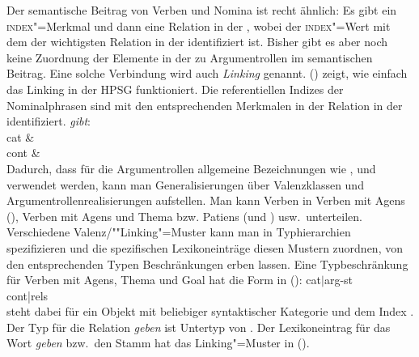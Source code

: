 Der semantische Beitrag von Verben und Nomina ist recht ähnlich: Es gibt ein \textsc{index}"=Merkmal
und dann eine Relation in der \relsl, wobei der \textsc{index}"=Wert mit dem \argzero der
wichtigsten Relation in der \relsl identifiziert ist. Bisher gibt es aber noch keine Zuordnung der Elemente in der \argstl{} zu
Argumentrollen im semantischen Beitrag. Eine solche Verbindung wird auch \emph{Linking} genannt.
() zeigt, wie einfach das Linking in der HPSG funktioniert.
Die referentiellen Indizes der Nominalphrasen sind mit den entsprechenden Merkmalen in der Relation
in der \relsl identifiziert.
\eas
\label{le-gibt}%
\emph{gibt}:\\
\ms
{ cat &  \\
  cont &  \\
}
\zs
Dadurch, dass für die Argumentrollen allgemeine Bezeichnungen wie \argone, \argtwo und \argthree
verwendet werden, kann man Generalisierungen über Valenzklassen und
Argumentrollenrealisierungen aufstellen. Man kann \zb Verben in Verben mit Agens (\argone), Verben mit Agens
und Thema bzw. Patiens (\argone und \argtwo) usw.\ unterteilen. Verschiedene Valenz/""Linking"=Muster kann man
in Typhierarchien spezifizieren und die spezifischen Lexikoneinträge diesen Mustern zuordnen,
\dash von den entsprechenden Typen Beschränkungen erben lassen. Eine Typbeschränkung für
Verben mit Agens, Thema und Goal hat die Form in ():
\ea
\onems
{ cat$|$arg-st  \\[1mm]
  cont|rels  \\
}
\z
[] steht dabei für ein Objekt mit beliebiger syntaktischer Kategorie und dem Index
. 
Der Typ für die Relation \emph{geben} ist Untertyp von .
Der Lexikoneintrag für das Wort \emph{geben} bzw.\ den Stamm  hat das Linking"=Muster in
(). 

